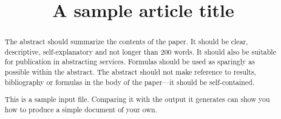 \documentclass[ejsv2]{imsart}
\theoremstyle{plain}
\theoremstyle{definition}
\theoremstyle{remark}
\begin{document}
\begin{frontmatter}
\title{A sample article title}


\begin{abstract}
The abstract should summarize the contents of the paper.
It should be clear, descriptive, self-explanatory and not longer
than 200 words. It should also be suitable for publication in
abstracting services. Formulas should be used as sparingly as
possible within the abstract. The abstract should not make
reference to results, bibliography or formulas in the body
of the paper---it should be self-contained.

This is a sample input file.  Comparing it with the output it
generates can show you how to produce a simple document of
your own.
\end{abstract}

\begin{keyword}[class=MSC]
\end{keyword}

\begin{keyword}
\end{keyword}

\end{frontmatter}
\end{document}
